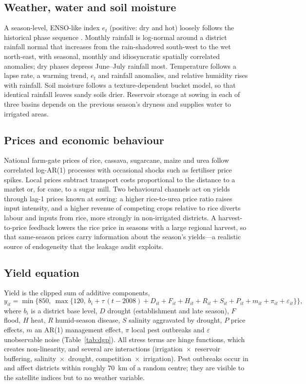\subsection{Weather, water and soil moisture}
A season-level, ENSO-like index $e_t$ (positive: dry and hot) loosely follows the historical phase sequence \citep{ropelewski1987global}. Monthly rainfall is log-normal around a district rainfall normal that increases from the rain-shadowed south-west to the wet north-east, with seasonal, monthly and idiosyncratic spatially correlated anomalies; dry phases depress June--July rainfall most. Temperature follows a lapse rate, a warming trend, $e_t$ and rainfall anomalies, and relative humidity rises with rainfall. Soil moisture follows a texture-dependent bucket model, so that identical rainfall leaves sandy soils drier. Reservoir storage at sowing in each of three basins depends on the previous season's dryness and supplies water to irrigated areas.

\subsection{Prices and economic behaviour}
National farm-gate prices of rice, cassava, sugarcane, maize and urea follow correlated log-AR(1) processes with occasional shocks such as fertiliser price spikes. Local prices subtract transport costs proportional to the distance to a market or, for cane, to a sugar mill. Two behavioural channels act on yields through lag-1 prices known at sowing: a higher rice-to-urea price ratio raises input intensity, and a higher revenue of competing crops relative to rice diverts labour and inputs from rice, more strongly in non-irrigated districts. A harvest-to-price feedback lowers the rice price in seasons with a large regional harvest, so that same-season prices carry information about the season's yields---a realistic source of endogeneity that the leakage audit exploits.

\subsection{Yield equation}
Yield is the clipped sum of additive components,
\begin{equation}\label{eq:yield}
y_{it} = \min\Big\{850,\ \max\big\{120,\ b_i + \tau\,(t-2008) + D_{it} + F_{it} + H_{it} + R_{it} + S_{it} + P_{it} + m_{it} + \pi_{it} + \varepsilon_{it}\big\}\Big\},
\end{equation}
where $b_i$ is a district base level, $D$ drought (establishment and late season), $F$ flood, $H$ heat, $R$ humid-season disease, $S$ salinity aggravated by drought, $P$ price effects, $m$ an AR(1) management effect, $\pi$ local pest outbreaks and $\varepsilon$ unobservable noise (Table~\ref{tab:dgp}). All stress terms are hinge functions, which creates non-linearity, and several are interactions (irrigation~$\times$~reservoir buffering, salinity~$\times$~drought, competition~$\times$~irrigation). Pest outbreaks occur in \pestYears{} and affect districts within roughly 70~km of a random centre; they are visible to the satellite indices but to no weather variable.

